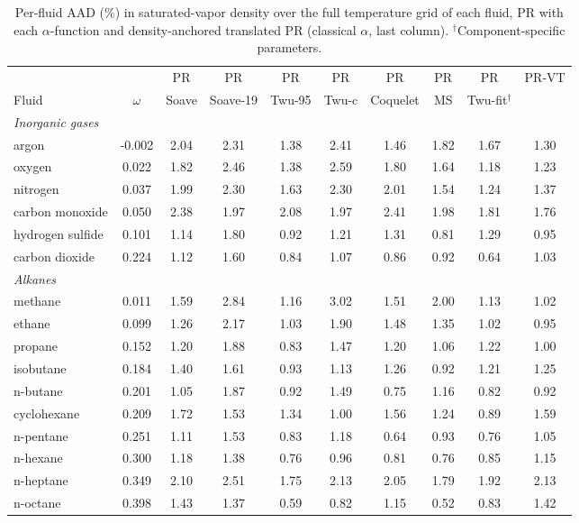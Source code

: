 \begin{table}[H]
\centering
\caption{Per-fluid AAD (\%) in saturated-vapor density over the full temperature grid of each fluid, PR with each $\alpha$-function and density-anchored translated PR (classical $\alpha$, last column). $^{\dagger}$Component-specific parameters.}
\label{tab:tabS_perfluid_rhov_pr}
\small
\begin{tabular}{lccccccccc}
\toprule
 &  & PR & PR & PR & PR & PR & PR & PR & PR-VT \\
Fluid & $\omega$ & Soave & Soave-19 & Twu-95 & Twu-c & Coquelet & MS & Twu-fit$^{\dagger}$ &  \\
\midrule
\multicolumn{10}{l}{\emph{Inorganic gases}} \\
argon & -0.002 & 2.04 & 2.31 & 1.38 & 2.41 & 1.46 & 1.82 & 1.67 & 1.30 \\
oxygen & 0.022 & 1.82 & 2.46 & 1.38 & 2.59 & 1.80 & 1.64 & 1.18 & 1.23 \\
nitrogen & 0.037 & 1.99 & 2.30 & 1.63 & 2.30 & 2.01 & 1.54 & 1.24 & 1.37 \\
carbon monoxide & 0.050 & 2.38 & 1.97 & 2.08 & 1.97 & 2.41 & 1.98 & 1.81 & 1.76 \\
hydrogen sulfide & 0.101 & 1.14 & 1.80 & 0.92 & 1.21 & 1.31 & 0.81 & 1.29 & 0.95 \\
carbon dioxide & 0.224 & 1.12 & 1.60 & 0.84 & 1.07 & 0.86 & 0.92 & 0.64 & 1.03 \\
\multicolumn{10}{l}{\emph{Alkanes}} \\
methane & 0.011 & 1.59 & 2.84 & 1.16 & 3.02 & 1.51 & 2.00 & 1.13 & 1.02 \\
ethane & 0.099 & 1.26 & 2.17 & 1.03 & 1.90 & 1.48 & 1.35 & 1.02 & 0.95 \\
propane & 0.152 & 1.20 & 1.88 & 0.83 & 1.47 & 1.20 & 1.06 & 1.22 & 1.00 \\
isobutane & 0.184 & 1.40 & 1.61 & 0.93 & 1.13 & 1.26 & 0.92 & 1.21 & 1.25 \\
n-butane & 0.201 & 1.05 & 1.87 & 0.92 & 1.49 & 0.75 & 1.16 & 0.82 & 0.92 \\
cyclohexane & 0.209 & 1.72 & 1.53 & 1.34 & 1.00 & 1.56 & 1.24 & 0.89 & 1.59 \\
n-pentane & 0.251 & 1.11 & 1.53 & 0.83 & 1.18 & 0.64 & 0.93 & 0.76 & 1.05 \\
n-hexane & 0.300 & 1.18 & 1.38 & 0.76 & 0.96 & 0.81 & 0.76 & 0.85 & 1.15 \\
n-heptane & 0.349 & 2.10 & 2.51 & 1.75 & 2.13 & 2.05 & 1.79 & 1.92 & 2.13 \\
n-octane & 0.398 & 1.43 & 1.37 & 0.59 & 0.82 & 1.15 & 0.52 & 0.83 & 1.42 \\

\end{tabular}
\end{table}

